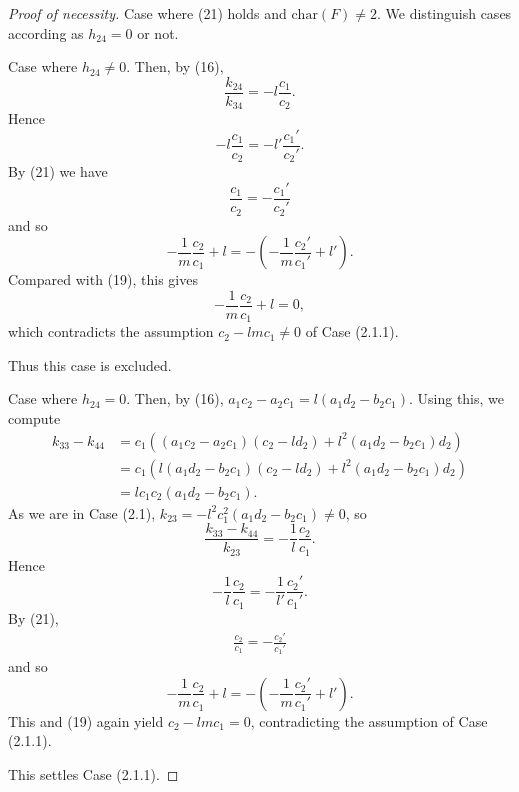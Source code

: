 \documentclass{article}
\begin{document}
\begin{proof}[Proof of necessity]
Case where (21) holds and $\text{char}(F)\ne 2$.
We distinguish cases according as $h_{24}=0$ or not.

Case where  $h_{24}\ne 0$. Then, by (16),
$$
\frac{k_{24}}{k_{34}}=-l \frac{c_1}{c_2}.
$$
Hence
$$
 -l \frac{c_1}{c_2}=-l' \frac{c_1'}{c_2'}.
$$
By (21) we have
$$
\frac{c_1}{c_2}=-\frac{c_1'}{c_2'} 
$$
and so
$$
-\frac{1}{m}\frac{c_2}{c_1}+l=-(-\frac{1}{m}\frac{c_2'}{c_1'}+l').
$$
Compared with (19), this gives  
$$
-\frac{1}{m}\frac{c_2}{c_1}+l=0,
$$
which contradicts the assumption $c_2-l m c_1\ne 0$ of Case (2.1.1).

Thus this case is excluded.

\medskip
Case where $h_{24}= 0$.
Then, by (16),  $a_1c_2-a_2c_1=l(a_1d_2-b_2c_1)$. 
Using this, we compute
\begin{align*}
k_{33}-k_{44}&=c_1((a_1c_2-a_2c_1)(c_2-ld_2)+l^2(a_1d_2-b_2c_1)d_2)\\
&=c_1(l(a_1d_2-b_2c_1)(c_2-ld_2)+l^2(a_1d_2-b_2c_1)d_2)\\
&=lc_1c_2(a_1d_2-b_2c_1).
\end{align*}
As we are in Case (2.1),
$k_{23}=-l^2c_1^2(a_1d_2-b_2c_1)\ne 0$,
so
$$
\frac{k_{33}-k_{44}}{k_{23}}=-\frac{1}{l}\frac{c_2}{c_1}.
$$
Hence
$$
-\frac{1}{l}\frac{c_2}{c_1}=-\frac{1}{l'}\frac{c_2'}{c_1'}.
$$
By (21),
\begin{align*}
\frac{c_2}{c_1}=-\frac{c_2'}{c_1'}
\end{align*}
and so
$$
-\frac{1}{m}\frac{c_2}{c_1}+l=-(-\frac{1}{m}\frac{c_2'}{c_1'}+l').
$$
This and (19)  again yield 
$c_2-l m c_1=0$, 
contradicting the assumption of Case (2.1.1).


This settles Case (2.1.1).


\end{proof}
\end{document}
